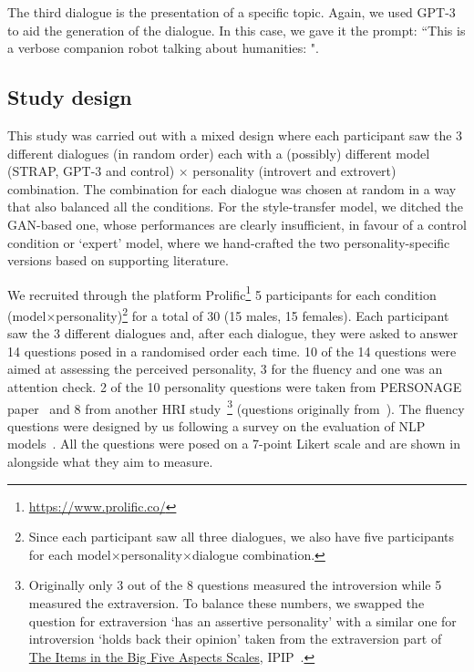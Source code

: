 \documentclass[nomenclature, english, biblatex]{kththesis}
\begin{document}
The third dialogue is the presentation of a specific topic. Again, we used GPT-3 to aid the generation of the dialogue. In this case, we gave it the prompt: ``This is a verbose companion robot talking about humanities: ".

\subsection{Study design}
This study was carried out with a mixed design where each participant saw the 3 different dialogues (in random order) each with a (possibly) different model (STRAP, GPT-3 and control) $\times$ personality (introvert and extrovert) combination. The combination for each dialogue was chosen at random in a way that also balanced all the conditions. For the style-transfer model, we ditched the GAN-based one, whose performances are clearly insufficient, in favour of a control condition or `expert' model, where we hand-crafted the two personality-specific versions based on supporting literature.

We recruited through the platform Prolific\footnote{\url{https://www.prolific.co/}} 5 participants for each condition (model$\times$personality)\footnote{Since each participant saw all three dialogues, we also have five participants for each model$\times$personality$\times$dialogue combination.} for a total of 30 (15 males, 15 females). Each participant saw the 3 different dialogues and, after each dialogue, they were asked to answer 14 questions posed in a randomised order each time. 10 of the 14 questions were aimed at assessing the perceived personality, 3 for the fluency and one was an attention check. 2 of the 10 personality questions were taken from PERSONAGE paper~\cite{mairesse2011controlling} and 8 from another \gls{HRI} study~\cite{andriella2020have}\footnote{Originally only 3 out of the 8 questions measured the introversion while 5 measured the extraversion. To balance these numbers, we swapped the question for extraversion `has an assertive personality' with a similar one for introversion `holds back their opinion' taken from the extraversion part of \href{https://ipip.ori.org/BFASKeys.htm\#BFASExtraversion}{The Items in the Big Five Aspects Scales}, IPIP~\cite{goldberg2006international}.} (questions originally from~\cite{john1999big}). The fluency questions were designed by us following a survey on the evaluation of \gls{NLP} models~\cite{celikyilmaz2020evaluation}. All the questions were posed on a 7-point Likert scale and are shown in  alongside what they aim to measure. 
\end{document}

